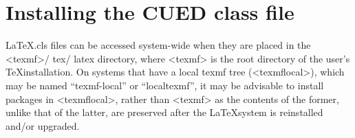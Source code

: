
\chapter{Installing the CUED class file}

\LaTeX .cls  files can be accessed system-wide when they are placed in the
<texmf>/ tex/ latex directory, where <texmf> is the root directory of the user’s
\TeX installation.
On systems that have a local texmf tree (<texmflocal>), which
may be named ``texmf-local'' or ``localtexmf'', it may be advisable to install
packages in <texmflocal>, rather than <texmf> as the contents of the former,
unlike that of the latter, are preserved after the \LaTeX system is reinstalled
and/or upgraded.
